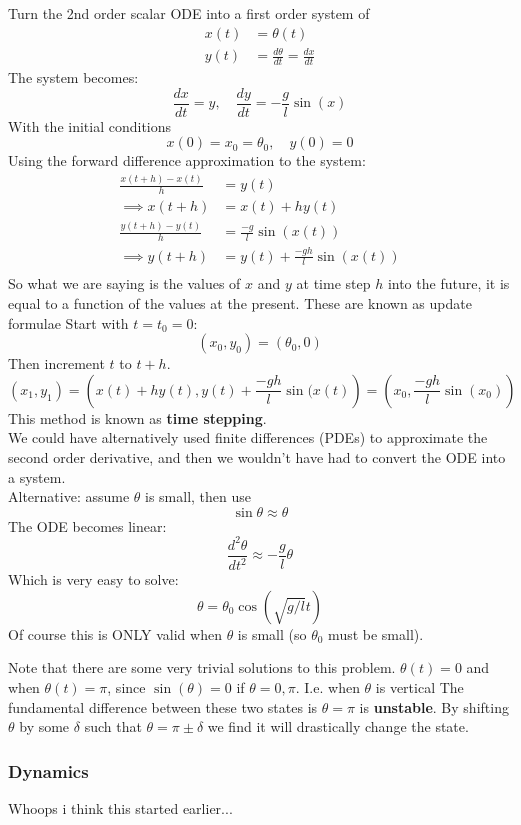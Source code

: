 \documentclass{X:/Documents/Coding/Latex/myassignment}
\begin{document}
Turn the 2nd order scalar ODE into a first order system of
\begin{align*}
    x(t) &= \theta(t)\\
    y(t) &= \frac{d\theta}{dt} = \frac{dx}{dt}
\end{align*}
The system becomes:
\[\frac{dx}{dt} = y , \quad \frac{dy}{dt} = -\frac{g}{l}\sin(x)\]
With the initial conditions 
\[x(0) = x_0 =\theta_0, \quad y(0) = 0\]
Using the forward difference approximation to the system:
\begin{align*}
    \frac{x(t+h) - x(t)}{h} &= y(t)\\
    \implies x(t+h) &= x(t) +hy(t) \\
    \frac{y(t+h)-y(t)}{h} &= \frac{-g}{l} \sin(x(t))\\
    \implies y(t+h) &= y(t)+ \frac{-gh}{l} \sin(x(t))\\
\end{align*}
So what we are saying is the values of $x$ and $y$ at time step $h$ into the future, it is equal to a function of the values at the present. These are known as update formulae 
Start with $t=t_0=0$:
\[(x_0,y_0) = (\theta_0,0)\]
Then increment $t$ to $t+h$.
\[(x_1,y_1) = \left(x(t) + hy(t),y(t)+ \frac{-gh}{l} \sin(x(t)\right)= \left(x_0, \frac{-gh}{l} \sin(x_0)\right)\]
This method is known as \textbf{time stepping}.\\
We could have alternatively used finite differences (PDEs) to approximate the second order derivative, and then we wouldn't have had to convert the ODE into a system.\\
Alternative: assume $\theta$ is small, then use 
\[\sin\theta \approx \theta\]
The ODE becomes linear:
\[\frac{d^2\theta}{dt^2} \approx- \frac{g}{l} \theta\]
Which is very easy to solve:
\[\theta = \theta_0 \cos(\sqrt{g/l} t)\]
Of course this is ONLY valid when $\theta$ is small (so $\theta_0$ must be small).

Note that there are some very trivial solutions to this problem. $\theta(t) = 0$ and when $\theta(t) = \pi$, since $\sin(\theta) = 0$ if $\theta=0,\pi$. I.e. when $\theta$ is vertical  
The fundamental difference between these two states is $\theta=\pi$ is \textbf{unstable}. By shifting $\theta$ by some $\delta$ such that $\theta = \pi \pm \delta$ we find it will drastically change the state.

\subsubsection{Dynamics}
Whoops i think this started earlier...
\end{document}
